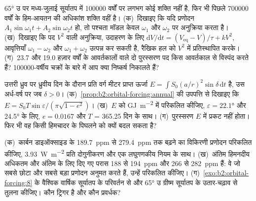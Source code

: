\begin{exercise}[$\star\star\star$]\label{exo:b2:orbital-forcing:10}
\ang{65} उ पर मध्य-जुलाई सूर्यातप में \num{100000} वर्षों पर लगभग कोई शक्ति नहीं है, फिर भी पिछले
\num{700000} वर्षों के हिम-आयतन की अधिकांश शक्ति वहीं है। (क)~दिखाइए कि यदि प्रणोदन $A_1\sin
\omega_1 t + A_2\sin\omega_2 t$ हो, तो पश्चता मॉडल केवल $\omega_1$ और $\omega_2$ पर अनुक्रिया करता है। (ख)~दिखाइए
कि पद $V^2$ वाली अनुक्रिया, उदाहरण के लिए $\mathrm dV/\mathrm dt = (V_{\mathrm{eq}} -
V)/\tau + kV^2$, आवृत्तियाँ $\omega_1 - \omega_2$ और $\omega_1 + \omega_2$ उत्पन्न कर सकती है,
रैखिक हल को $V^2$ में प्रतिस्थापित करके। (ग)~\num{23.7} और
\num{19.0} हज़ार वर्षों के आवर्तकालों वाले दो पुरस्सरण पद किस आवर्तकाल से विस्पंद करते हैं? \num{100000}-वर्षीय
चक्रों के बारे में आप क्या निष्कर्ष निकालते हैं?
\end{exercise}

\begin{exercise}[$\star\star\star$]\label{exo:b2:orbital-forcing:11}
उत्तरी ध्रुव पर ध्रुवीय दिन के दौरान प्रति वर्ग मीटर प्राप्त ऊर्जा $E = \int S_0(a/r)^2
\sin\delta\,\mathrm dt$ है, उस अर्ध-वर्ष पर जब $\delta > 0$। (क)~\cref{prop:b2:orbital-forcing:annual} की
उपपत्ति से दिखाइए कि $E = S_0T\sin\varepsilon/(\pi\sqrt{1 - e^2})$। (ख)~$E$ को \unit{GJ.m^{-2}} में परिकलित कीजिए, $\varepsilon = \ang{22.1}$ और \ang{24.5} के लिए, $e = 0.0167$ और $T$ =
365.25 दिन के साथ।
(ग)~पुरस्सरण $E$ में प्रकट नहीं होता। फिर भी वह किसी हिमचादर के पिघलने को क्यों
बदल सकता है?
\end{exercise}

\begin{exercise}[$\star\star\star$]\label{exo:b2:orbital-forcing:12}
(क)~कार्बन डाइऑक्साइड के \qty{189.7}{ppm} से \qty{279.4}{ppm} तक बढ़ने का विकिरणी प्रणोदन परिकलित कीजिए,
\qty{3.93}{W.m^{-2}} प्रति दोगुनीकरण और एक लघुगणकीय नियम के साथ। (ख)~अंतिम हिमनदीय अधिकतम और अंतिम  के लिए
दिए गए परास 188 से \qty{194}{ppm} और 266 से
\qty{282}{ppm} हैं: वे जो सबसे छोटा और सबसे बड़ा प्रणोदन अनुमत करते हैं, उन्हें परिकलित कीजिए। (ग)~\cref{exo:b2:orbital-forcing:8} के
वैश्विक वार्षिक सूर्यातप के परिवर्तन से और \ang{65} उ ग्रीष्म सूर्यातप के उतार-चढ़ाव से
तुलना कीजिए। कौन ट्रिगर है और कौन प्रवर्धक?
\end{exercise}

